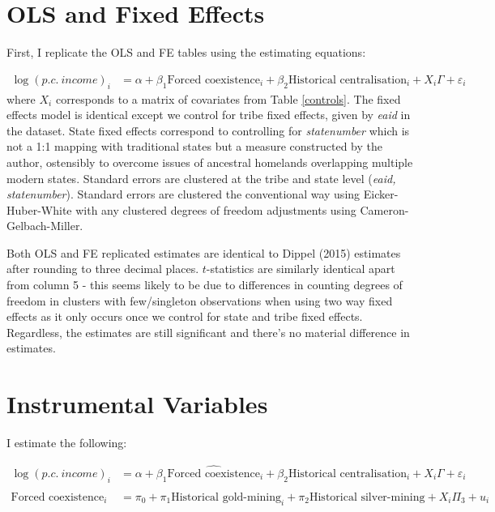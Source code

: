 \documentclass{article}
\begin{document}
\section{ OLS and Fixed Effects}
First, I replicate the OLS and FE tables using the estimating equations:

\begin{align*}
    \log(p.c. \ income)_i &= \alpha + \beta_1 \text{Forced coexistence}_i   + \beta_2 \text{Historical centralisation}_i + X_i \Gamma  + \varepsilon_i
\end{align*}
 where $X_i$ corresponds to a matrix of covariates from Table \ref{controls}. The 
 fixed effects model is identical except we control for tribe fixed effects, given by \textit{eaid} in the dataset. State fixed 
 effects correspond to controlling for \textit{statenumber} which is not a 1:1 mapping with traditional states but a measure 
 constructed by the author, ostensibly to overcome issues of ancestral homelands overlapping multiple modern states. Standard 
 errors are clustered at the tribe and state level (\textit{eaid, statenumber}). Standard errors are clustered the conventional way using 
 Eicker-Huber-White with any clustered degrees of freedom adjustments using Cameron-Gelbach-Miller.





% 
% 




Both OLS and FE replicated estimates are identical to Dippel (2015) estimates 
after rounding to three decimal places. $t$-statistics are similarly identical apart 
from column 5 - this seems likely to be due to differences in counting degrees of freedom in clusters
with few/singleton observations when using two way fixed effects as it only occurs once we control for state and tribe fixed effects. 
Regardless, the estimates are still significant and there's no material difference in estimates.

\section{Instrumental Variables}
I estimate the following:

\begin{align*}
    \log(p.c. \ income)_i &= \alpha + \beta_1 \widehat{\text{Forced coexistence}}_i   + \beta_2 \text{Historical centralisation}_i + X_i \Gamma  + \varepsilon_i \\ \\
\text{Forced coexistence}_i &= \pi_0 + \pi_1 \text{Historical gold-mining}_i + \pi_2 \text{Historical silver-mining} + X_i \Pi_3 + u_i
\end{align*}
\end{document}
